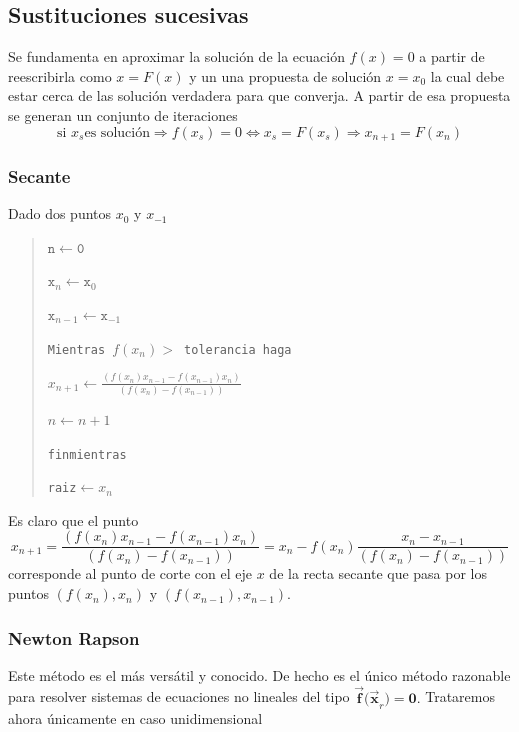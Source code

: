 \documentclass[spanish,titlepage,11pt]{article}
\begin{document}
\subsection{Sustituciones sucesivas}

Se fundamenta en aproximar la soluci\'{o}n de la ecuaci\'{o}n $f(x)=0$ a
partir de reescribirla como $x=F(x)$ y un una propuesta de soluci\'{o}n
$x=x_{0}$ la cual debe estar cerca de las soluci\'{o}n verdadera para que
converja. A partir de esa propuesta se generan un conjunto de iteraciones
\[
\text{si }x_{s}\text{es soluci\'{o}n}\Rightarrow f(x_{s})=0\Leftrightarrow
x_{s}=F(x_{s})\Longrightarrow x_{n+1}=F(x_{n})
\]

\subsubsection{Secante}

Dado dos puntos $x_{0}$ y $x_{-1}$

\begin{quotation}
$\mathtt{n\leftarrow0}$

$\mathtt{x}_{n}\mathtt{\leftarrow x}_{0}$

$\mathtt{x}_{n-1}\mathtt{\leftarrow x}_{-1}$

\texttt{Mientras }$f(x_{n})>$\texttt{\ tolerancia haga}

\qquad$x_{n+1}\leftarrow\frac{\left(  f(x_{n})x_{n-1}-f(x_{n-1})x_{n}\right)
}{\left(  f(x_{n})-f(x_{n-1})\right)  }$

\qquad$n\leftarrow n+1$

\texttt{finmientras}

\texttt{raiz}$\leftarrow x_{n}$
\end{quotation}

Es claro que el punto
\[
x_{n+1}=\frac{\left(  f(x_{n})x_{n-1}-f(x_{n-1})x_{n}\right)  }{\left(
f(x_{n})-f(x_{n-1})\right)  }=x_{n}-f(x_{n})\frac{x_{n}-x_{n-1}}{\left(
f(x_{n})-f(x_{n-1})\right)  }
\]
corresponde al punto de corte con el eje $x$ de la recta secante que pasa por
los puntos $\left(  f(x_{n}),x_{n}\right)  $ y $\left(  f(x_{n-1}%
),x_{n-1}\right)  .$

\subsubsection{Newton Rapson}

Este m\'{e}todo es el m\'{a}s vers\'{a}til y conocido. De hecho es el
\'{u}nico m\'{e}todo razonable para resolver sistemas de ecuaciones no
lineales del tipo $\mathbf{\vec{f}(\vec{x}}_{r}\mathbf{)=0.}$ Trataremos ahora
\'{u}nicamente en caso unidimensional
\end{document}
